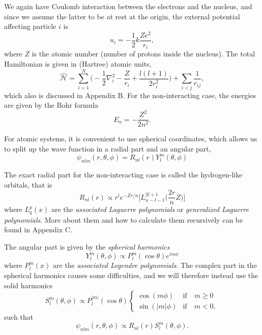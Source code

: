 We again have Coulomb interaction between the electrons and the nucleus, and since we assume the latter to be at rest at the origin, the external potential affecting particle $i$ is
\begin{equation}
u_i=- \frac{1}{2} k\frac{Ze^2}{r_i},
\end{equation}
where $Z$ is the atomic number (number of protons inside the nucleus). The total Hamiltonian is given in (Hartree) atomic units, 
\begin{equation}
\label{eq:AtomicHamiltonian}
\hat{\mathcal{H}} = \sum_{i=1}^{N} \Big(-\frac{1}{2} \nabla_i^2 - \frac{Z}{r_i}+\frac{l(l+1)}{2r_i^2}\Big) + \sum_{i<j} \frac{1}{r_{ij}},
\end{equation}
which also is discussed in Appendix B. For the non-interacting case, the energies are given by the Bohr formula
\begin{equation}
E_n=-\frac{Z^2}{2n^2}.
\label{eq:bohrformula}
\end{equation}

For atomic systems, it is convenient to use spherical coordinates, which allows us to split up the wave function in a radial part and an angular part,
\begin{equation}
\psi_{nlm}(r,\theta,\phi)=R_{nl}(r)Y_l^m(\theta,\phi)
\label{eq:hydrogenlike}
\end{equation}

The exact radial part for the non-interacting case is called the hydrogen-like orbitals, that is
\begin{equation}
R_{nl}(r)\propto r^le^{-Zr/n}\Big[L_{n-l-1}^{2l+1}\Big(\frac{2r}{n}Z\Big)\Big]
\end{equation}
where $L_{q}^p(x)$ are the \textit{associated Laguerre polynomials} or \textit{generalized Laguerre polynomials}. More about them and how to calculate them recursively can be found in Appendix C. 

The angular part is given by the \textit{spherical harmonics}
\begin{equation}
Y_l^m(\theta,\phi)\propto P_l^m(\cos\theta)e^{im\phi}
\end{equation}
where $P_l^m(x)$ are the \textit{associated Legendre polynomials}. The complex part in the spherical harmonics causes some difficulties, and we will therefore instead use the solid harmonics
\begin{equation}
\label{eq:V_ext}
S_l^m(\theta,\phi)\propto P_l^{|m|}(\cos\theta)
\begin{cases} 
\cos(m\phi) & \text{if} \quad m\geq0 \\
\sin(|m|\phi) & \text{if} \quad m<0,
\end{cases}
\end{equation}
such that
\begin{equation}
\psi_{nlm}(r,\theta,\phi)\propto R_{nl}(r)S_l^m(\theta,\phi).
\label{eq:hydrogenlikesolid}
\end{equation}

